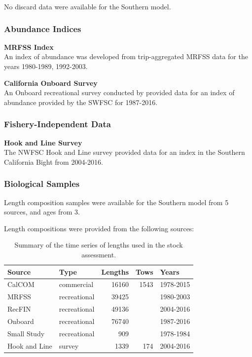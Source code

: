\documentclass[12pt,]{article}
\begin{document}
No discard data were available for the Southern model.

\subsubsection{Abundance Indices}\label{abundance-indices-1}

\textbf{MRFSS Index}\\
An index of abundance was developed from trip-aggregated MRFSS data for
the years 1980-1989, 1992-2003.

\textbf{California Onboard Survey}\\
An Onboard recreational survey conducted by provided data for an index
of abundance provided by the SWFSC for 1987-2016.

\subsubsection{Fishery-Independent
Data}\label{fishery-independent-data-1}

\textbf{Hook and Line Survey}\\
The NWFSC Hook and Line survey provided data for an index in the
Southern California Bight from 2004-2016.

\subsubsection{Biological Samples}\label{biological-samples-1}

Length composition samples were available for the Southern model from 5
sources, and ages from 3.

Length compositions were provided from the following sources:

\begin{table}[ht]
\centering
\caption{Summary of the time series of lengths used in the stock assessment.} 
\label{tab:Length_sources}
\begin{tabular}{llrrl}
  \hline
Source & Type & Lengths & Tows & Years \\ 
  \hline
CalCOM & commercial & 16160 & 1543 & 1978-2015 \\ 
  MRFSS & recreational & 39425 &  & 1980-2003 \\ 
  RecFIN & recreational & 49136 &  & 2004-2016 \\ 
  Onboard & recreational & 76740 &  & 1987-2016 \\ 
  Small Study & recreational & 909 &  & 1978-1984 \\ 
  Hook and Line & survey & 1339 & 174 & 2004-2016 \\ 
   \hline
\end{tabular}
\end{table}
\end{document}
